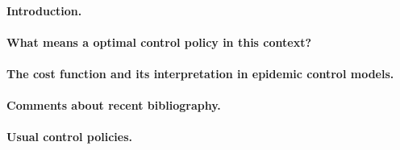 
\paragraph{Introduction.} 


\paragraph{What means a optimal control policy in this context?}

\paragraph{The cost function and its interpretation in epidemic control models.}

\paragraph{Comments about recent bibliography.}

\paragraph{Usual control policies.}
